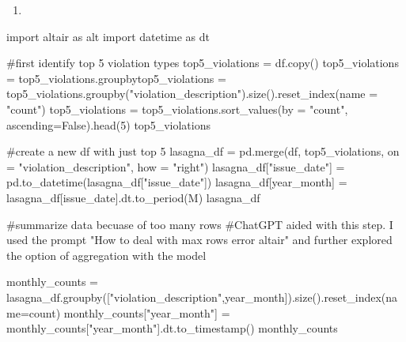 \documentclass[
  letterpaper,
  DIV=11,
  numbers=noendperiod]{scrartcl}
\newenvironment{Shaded}{\begin{snugshade}}{\end{snugshade}}
\newcommand{\CommentTok}[1]{\textcolor[rgb]{0.37,0.37,0.37}{#1}}
\newcommand{\DecValTok}[1]{\textcolor[rgb]{0.68,0.00,0.00}{#1}}
\newcommand{\ImportTok}[1]{\textcolor[rgb]{0.00,0.46,0.62}{#1}}
\newcommand{\NormalTok}[1]{\textcolor[rgb]{0.00,0.23,0.31}{#1}}
\newcommand{\OperatorTok}[1]{\textcolor[rgb]{0.37,0.37,0.37}{#1}}
\newcommand{\StringTok}[1]{\textcolor[rgb]{0.13,0.47,0.30}{#1}}
\newcommand{\VariableTok}[1]{\textcolor[rgb]{0.07,0.07,0.07}{#1}}
\providecommand{\tightlist}{%
  \setlength{\itemsep}{0pt}\setlength{\parskip}{0pt}}\usepackage{longtable,booktabs,array}
\begin{document}
\begin{enumerate}
\def\labelenumi{\arabic{enumi}.}
\tightlist
\item
\end{enumerate}

\begin{Shaded}
\begin{Highlighting}[]
\ImportTok{import}\NormalTok{ altair }\ImportTok{as}\NormalTok{ alt}
\ImportTok{import}\NormalTok{ datetime }\ImportTok{as}\NormalTok{ dt}

\CommentTok{\#first identify top 5 violation types}
\NormalTok{top5\_violations }\OperatorTok{=}\NormalTok{ df.copy()}
\NormalTok{top5\_violations }\OperatorTok{=}\NormalTok{ top5\_violations.groupbytop5\_violations }\OperatorTok{=}\NormalTok{ top5\_violations.groupby(}\StringTok{"violation\_description"}\NormalTok{).size().reset\_index(name }\OperatorTok{=} \StringTok{"count"}\NormalTok{)}
\NormalTok{top5\_violations }\OperatorTok{=}\NormalTok{ top5\_violations.sort\_values(by }\OperatorTok{=} \StringTok{"count"}\NormalTok{, ascending}\OperatorTok{=}\VariableTok{False}\NormalTok{).head(}\DecValTok{5}\NormalTok{)}
\NormalTok{top5\_violations}

\CommentTok{\#create a new df with just top 5}
\NormalTok{lasagna\_df }\OperatorTok{=}\NormalTok{ pd.merge(df, top5\_violations, on }\OperatorTok{=} \StringTok{"violation\_description"}\NormalTok{, how }\OperatorTok{=} \StringTok{"right"}\NormalTok{)}
\NormalTok{lasagna\_df[}\StringTok{"issue\_date"}\NormalTok{] }\OperatorTok{=}\NormalTok{ pd.to\_datetime(lasagna\_df[}\StringTok{"issue\_date"}\NormalTok{])}
\NormalTok{lasagna\_df[}\StringTok{\textquotesingle{}year\_month\textquotesingle{}}\NormalTok{] }\OperatorTok{=}\NormalTok{ lasagna\_df[}\StringTok{\textquotesingle{}issue\_date\textquotesingle{}}\NormalTok{].dt.to\_period(}\StringTok{\textquotesingle{}M\textquotesingle{}}\NormalTok{) }
\NormalTok{lasagna\_df}

\CommentTok{\#summarize data becuase of too many rows}
\CommentTok{\#ChatGPT aided with this step. I used the prompt "How to deal with max rows error altair" and further explored the option of aggregation with the model}

\NormalTok{monthly\_counts }\OperatorTok{=}\NormalTok{ lasagna\_df.groupby([}\StringTok{"violation\_description"}\NormalTok{,}\StringTok{\textquotesingle{}year\_month\textquotesingle{}}\NormalTok{]).size().reset\_index(name}\OperatorTok{=}\StringTok{\textquotesingle{}count\textquotesingle{}}\NormalTok{)}
\NormalTok{monthly\_counts[}\StringTok{"year\_month"}\NormalTok{] }\OperatorTok{=}\NormalTok{ monthly\_counts[}\StringTok{"year\_month"}\NormalTok{].dt.to\_timestamp()}
\NormalTok{monthly\_counts}


\end{Highlighting}
\end{Shaded}
\end{document}
